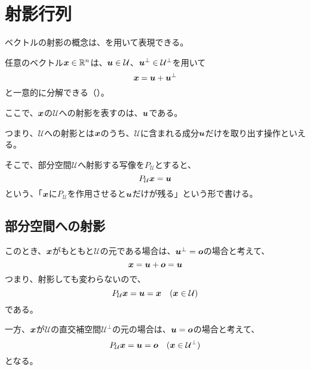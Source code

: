 \documentclass[../../../topic_linear-algebra]{subfiles}
\begin{document}
\sectionline
\section{射影行列}

ベクトルの射影の概念は、を用いて表現できる。

\br

任意のベクトル$\vb*{x} \in \mathbb{R}^n$は、$\vb*{u} \in \mathcal{U}$、$\vb*{u}^\perp \in \mathcal{U}^\perp$を用いて
\begin{equation*}
  \vb*{x} = \vb*{u} + \vb*{u}^\perp
\end{equation*}
と一意的に分解できる（）。

\br

ここで、$\vb*{x}$の$\mathcal{U}$への射影を表すのは、$\vb*{u}$である。

つまり、$\mathcal{U}$への射影とは$\vb*{x}$のうち、$\mathcal{U}$に含まれる成分$\vb*{u}$だけを取り出す操作といえる。

そこで、部分空間$\mathcal{U}$へ射影する写像を$P_{\mathcal{U}}$とすると、
\begin{equation*}
  P_{\mathcal{U}}\vb*{x} = \vb*{u}
\end{equation*}
という、「$\vb*{x}$に$P_{\mathcal{U}}$を作用させると$\vb*{u}$だけが残る」という形で書ける。

\subsection{部分空間への射影}\label{sec:projection-onto-subspace}

このとき、$\vb*{x}$がもともと$\mathcal{U}$の元である場合は、$\vb*{u}^\perp = \vb*{o}$の場合と考えて、
\begin{equation*}
  \vb*{x} = \vb*{u} + \vb*{o} = \vb*{u}
\end{equation*}
つまり、射影しても変わらないので、
\begin{equation*}
  P_{\mathcal{U}}\vb*{x} = \vb*{u} = \vb*{x} \quad (\vb*{x} \in \mathcal{U})
\end{equation*}
である。

\br

一方、$\vb*{x}$が$\mathcal{U}$の直交補空間$\mathcal{U}^{\perp}$の元の場合は、$\vb*{u} = \vb*{o}$の場合と考えて、
\begin{equation*}
  P_{\mathcal{U}}\vb*{x} = \vb*{u} = \vb*{o} \quad (\vb*{x} \in \mathcal{U}^{\perp})
\end{equation*}
となる。
\end{document}
